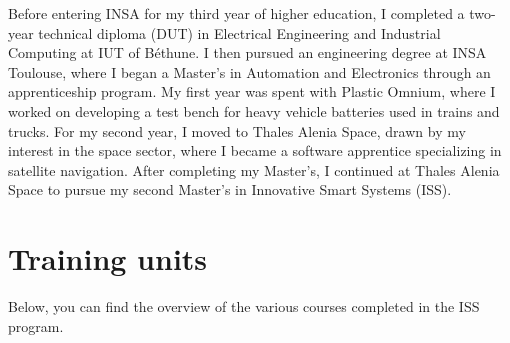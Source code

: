 Before entering INSA for my third year of higher education, I completed a two-year technical diploma (DUT) in Electrical Engineering and Industrial Computing at IUT of Béthune. 
I then pursued an engineering degree at INSA Toulouse, where I began a Master’s in Automation and Electronics through an apprenticeship program. 
My first year was spent with Plastic Omnium, where I worked on developing a test bench for heavy vehicle batteries used in trains and trucks. 
For my second year, I moved to Thales Alenia Space, drawn by my interest in the space sector, where I became a software apprentice specializing in satellite navigation.
After completing my Master’s, I continued at Thales Alenia Space to pursue my second Master’s in Innovative Smart Systems (ISS).



\section{Training units}

Below, you can find the overview of the various courses completed in the ISS program.

